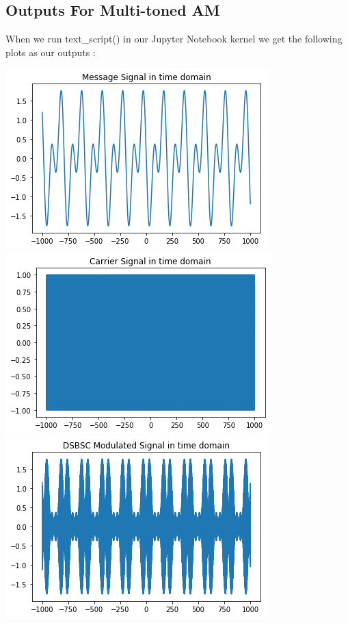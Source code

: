 \documentclass[12pt,a4paper]{article}%
\begin{document}
\begin{flushleft}
   \subsection{Outputs For Multi-toned AM}
   When we run text\_script() in our Jupyter Notebook kernel we get the following plots as our outputs :
   \begin{center}
		{\includegraphics[width=0.80 \textwidth]{./images/m_sig1.PNG}}\\\bigskip
		{\includegraphics[width=0.80 \textwidth]{./images/c_sig1.PNG}}
		{\includegraphics[width=0.80 \textwidth]{./images/modu1.PNG}}\\\bigskip

\end{center}
\end{flushleft}
\end{document}
